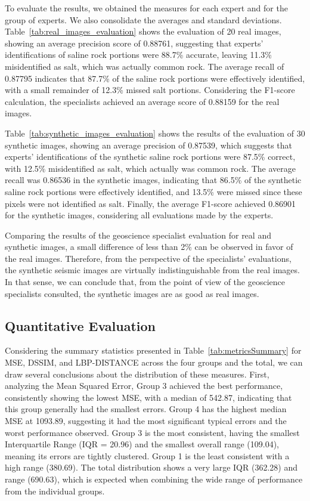 \documentclass{ieeeaccess}
\begin{document}
To evaluate the results, we obtained the measures for each expert and for the group of experts. We also consolidate the averages and standard deviations. Table~\ref{tab:real_images_evaluation} shows the evaluation of 20 real images, showing an average precision score of 0.88761, suggesting that experts' identifications of saline rock portions were 88.7\% accurate, leaving 11.3\% misidentified as salt, which was actually common rock. The average recall of 0.87795 indicates that 87.7\% of the saline rock portions were effectively identified, with a small remainder of 12.3\% missed salt portions. Considering the F1-score calculation, the specialists achieved an average score of 0.88159 for the real images.

Table~\ref{tab:synthetic_images_evaluation} shows the results of the evaluation of 30 synthetic images, showing an average precision of 0.87539, which suggests that experts' identifications of the synthetic saline rock portions were 87.5\% correct, with 12.5\% misidentified as salt, which actually was common rock. The average recall was 0.86536 in the synthetic images, indicating that 86.5\% of the synthetic saline rock portions were effectively identified, and 13.5\% were missed since these pixels were not identified as salt. Finally, the average F1-score achieved 0.86901 for the synthetic images, considering all evaluations made by the experts.

Comparing the results of the geoscience specialist evaluation for real and synthetic images, a small difference of less than 2\% can be observed in favor of the real images. Therefore, from the perspective of the specialists' evaluations, the synthetic seismic images are virtually indistinguishable from the real images. In that sense, we can conclude that, from the point of view of the geoscience specialists consulted, the synthetic images are as good as real images.

\subsection{Quantitative Evaluation} 

Considering the summary statistics presented in Table~\ref{tab:metricsSummary} for MSE, DSSIM, and LBP-DISTANCE across the four groups and the total, we can draw several conclusions about the distribution of these measures. First, analyzing the Mean Squared Error, Group 3 achieved the best performance, consistently showing the lowest MSE, with a median of 542.87, indicating that this group generally had the smallest errors. Group 4 has the highest median MSE at 1093.89, suggesting it had the most significant typical errors and the worst performance observed. Group 3 is the most consistent, having the smallest Interquartile Range (IQR = 20.96) and the smallest overall range (109.04), meaning its errors are tightly clustered. Group 1 is the least consistent with a high range (380.69). The total distribution shows a very large IQR (362.28) and range (690.63), which is expected when combining the wide range of performance from the individual groups.
\end{document}
